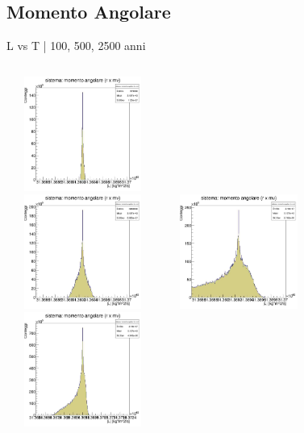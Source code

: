     \subsection[L]{Momento Angolare}
        \begin{frame}{L vs T | 100, 500, 2500 anni}
            \begin{columns}
                    \centering        
                    \includegraphics[width=5cm,height=3.75cm]{3_Momento/L_100_3600.jpg}\\
                    \includegraphics[width=5cm,height=3.75cm]{3_Momento/L_500_3600.jpg}
                    \label{cfr::LT}              
                    \centering        
                    \includegraphics[width=5cm,height=3.75cm]{3_Momento/L_2500_3600_stretto.jpg}\\
                    \includegraphics[width=5cm,height=3.75cm]{3_Momento/L_2500_3600_larg.jpg}
                    \label{cfr::LT2}      
            \end{columns}
        \end{frame}
        
